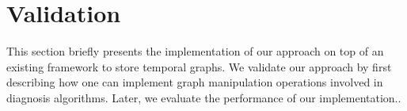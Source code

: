 \section{Validation}
\label{sec:tkm:validation}

This section briefly presents the implementation of our approach on top of an existing framework to store temporal graphs.
We validate our approach by first describing how one can implement graph manipulation operations involved in diagnosis algorithms. Later, we evaluate the performance of our implementation..

